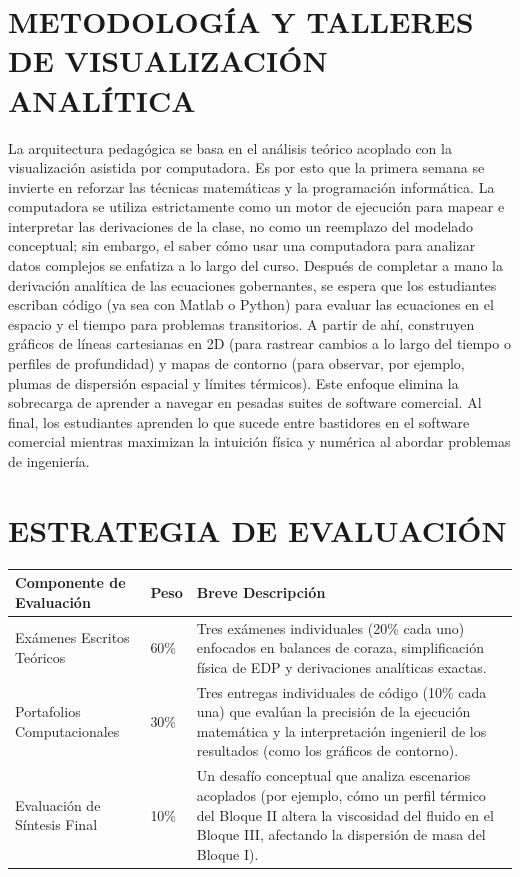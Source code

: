 \section{METODOLOGÍA Y TALLERES DE VISUALIZACIÓN ANALÍTICA}
La arquitectura pedagógica se basa en el {análisis teórico} acoplado con la {visualización asistida por computadora}.
Es por esto que la primera semana se invierte en reforzar las técnicas matemáticas y la programación informática.
La computadora se utiliza estrictamente como un motor de ejecución para mapear e interpretar las derivaciones de la clase, no como un reemplazo del modelado conceptual;
sin embargo, el saber cómo usar una computadora para analizar datos complejos se enfatiza a lo largo del curso.
Después de completar a mano la derivación analítica de las ecuaciones gobernantes, se espera que los estudiantes escriban código (ya sea con Matlab o Python) para evaluar las ecuaciones en el espacio y el tiempo para problemas transitorios.
A partir de ahí, construyen {gráficos de líneas cartesianas en 2D} (para rastrear cambios a lo largo del tiempo o perfiles de profundidad) y {mapas de contorno} (para observar, por ejemplo, plumas de dispersión espacial y límites térmicos).
Este enfoque elimina la sobrecarga de aprender a navegar en pesadas suites de software comercial.
Al final, los estudiantes aprenden lo que sucede entre bastidores en el software comercial mientras maximizan la intuición física y numérica al abordar problemas de ingeniería.

\section{ESTRATEGIA DE EVALUACIÓN}
\begin{table}[H]
\centering
\small
\begin{tabular}{llp{8cm}}
\toprule
\textbf{Componente de Evaluación} & \textbf{Peso} & \textbf{Breve Descripción} \\
\midrule
Exámenes Escritos Teóricos & 60\% & Tres exámenes individuales (20\% cada uno) enfocados en balances de coraza, simplificación física de EDP y derivaciones analíticas exactas.
\\
\addlinespace
Portafolios Computacionales & 30\% & Tres entregas individuales de código (10\% cada una) que evalúan la precisión de la ejecución matemática y la interpretación ingenieril de los resultados (como los gráficos de contorno).
\\
\addlinespace
Evaluación de Síntesis Final & 10\% & Un desafío conceptual que analiza escenarios acoplados (por ejemplo, cómo un perfil térmico del Bloque II altera la viscosidad del fluido en el Bloque III, afectando la dispersión de masa del Bloque I).
\\
\bottomrule
\end{tabular}
\end{table}

